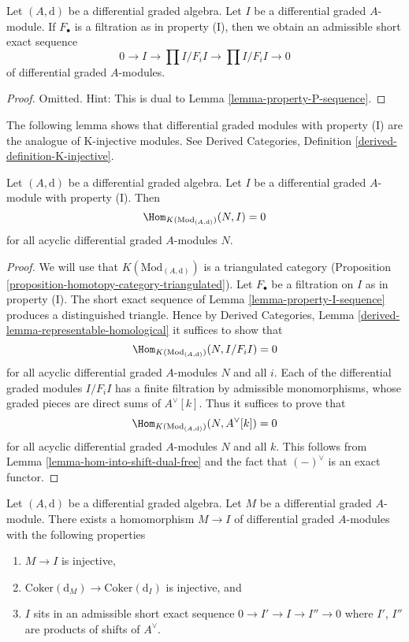 \begin{lemma}
\label{lemma-property-I-sequence}
Let $(A, \text{d})$ be a differential graded algebra.
Let $I$ be a differential graded $A$-module. If $F_\bullet$
is a filtration as in property (I), then we obtain an
admissible short exact sequence
$$
0 \to I \to
\prod\nolimits I/F_iI \to
\prod\nolimits I/F_iI \to 0
$$
of differential graded $A$-modules.
\end{lemma}

\begin{proof}
Omitted. Hint: This is dual to Lemma \ref{lemma-property-P-sequence}.
\end{proof}

\noindent
The following lemma shows that differential graded modules with
property (I) are the analogue of K-injective modules. See
Derived Categories, Definition \ref{derived-definition-K-injective}.

\begin{lemma}
\label{lemma-property-I-K-injective}
Let $(A, \text{d})$ be a differential graded algebra.
Let $I$ be a differential graded $A$-module with property (I).
Then
$$
\Hom_{K(\text{Mod}_{(A, \text{d})})}(N, I) = 0
$$
for all acyclic differential graded $A$-modules $N$.
\end{lemma}

\begin{proof}
We will use that $K(\text{Mod}_{(A, \text{d})})$ is a triangulated
category (Proposition \ref{proposition-homotopy-category-triangulated}).
Let $F_\bullet$ be a filtration on $I$ as in property (I).
The short exact sequence of Lemma \ref{lemma-property-I-sequence}
produces a distinguished triangle. Hence by
Derived Categories, Lemma \ref{derived-lemma-representable-homological}
it suffices to show that
$$
\Hom_{K(\text{Mod}_{(A, \text{d})})}(N, I/F_iI) = 0
$$
for all acyclic differential graded $A$-modules $N$ and all $i$.
Each of the differential graded modules $I/F_iI$ has a finite filtration
by admissible monomorphisms, whose graded pieces are
direct sums of $A^\vee[k]$. Thus it suffices to prove that
$$
\Hom_{K(\text{Mod}_{(A, \text{d})})}(N, A^\vee[k]) = 0
$$
for all acyclic differential graded $A$-modules $N$ and all $k$.
This follows from Lemma \ref{lemma-hom-into-shift-dual-free}
and the fact that $(-)^\vee$ is an exact functor.
\end{proof}

\begin{lemma}
\label{lemma-good-sub}
Let $(A, \text{d})$ be a differential graded algebra.
Let $M$ be a differential graded $A$-module. There exists a homomorphism
$M \to I$ of differential graded $A$-modules with the following
properties
\begin{enumerate}
\item $M \to I$ is injective,
\item $\text{Coker}(\text{d}_M) \to \text{Coker}(\text{d}_I)$ is injective,
and
\item $I$ sits in an admissible short exact sequence
$0 \to I' \to I \to I'' \to 0$ where $I'$, $I''$ are products
of shifts of $A^\vee$.
\end{enumerate}
\end{lemma}

